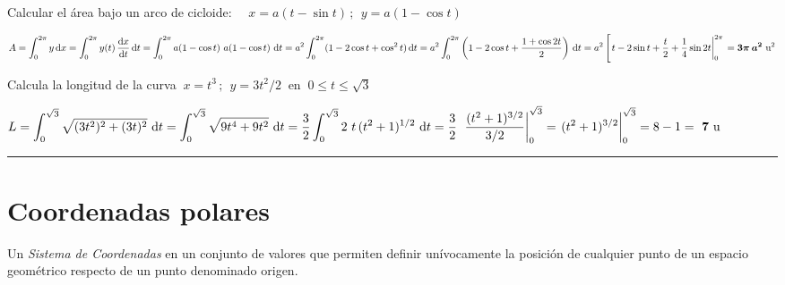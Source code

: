 \vspace{5mm}

\begin{mipropuesto}
	
 
Calcular el área bajo un arco de cicloide: $\quad x=a(t-\sin t)\, ;\ \ y=a(1-\cos t)$

\end{mipropuesto}

$A=\displaystyle \int_0^{2\pi} y\, \dd x=\int_0^{2\pi} y(t)\, \dv{x}{t}\, \dd t = \int_0^{2\pi} a(1-\cos t)\ a(1-\cos t) \ \dd t=a^2\int_0^{2\pi} (1-2\cos t+\cos^2 t)\, \dd t= a^2\int_0^{2\pi} \left(1-2\cos t+\dfrac{1+\cos 2t}{2} \right)\, \dd t= 	a^2\left[ \eval{t-2\sin t+\dfrac t 2 +\dfrac 1 4 \sin 2t }_0^{2\pi} \right.= \boldsymbol{ 3\pi \, a^2 }\ \mathrm{u}^2$
	
	\vspace{5mm}

\begin{mipropuesto}

Calcula la longitud de la curva $\ x=t^3\, ; \ \ y=3t^2/2\ $ en $\ 0\leqslant t\leqslant \sqrt 3$

\end{mipropuesto}

$L=\displaystyle \int_0^{\sqrt 3} \sqrt{(3t^2)^2+(3t)^2}\ \dd t = \int_0^{\sqrt 3} \sqrt{9t^4+9t^2}\ \dd t=\dfrac 3 2  \int_0^{\sqrt 3} 2\ t \, (t^2+1)^{1/2} \ \dd t = \dfrac 3 2 \ \eval{\dfrac{(t^2+1)^{3/2}}{3/2}}_0^{\sqrt{3}}=\eval{(t^2+1)^{3/2}}_0^{\sqrt{3}}=8-1=\ \boldsymbol 7\ \mathrm{u}$
	

\begin{flushright}\textcolor{teal}{\rule{250pt}{0.2pt}}	\end{flushright}

\section{Coordenadas polares}

\vspace{-5mm}
\vspace{0.5cm}

Un \emph{Sistema de Coordenadas} en un conjunto de valores que permiten definir unívocamente la posición de cualquier punto de un espacio geométrico respecto de un punto denominado origen. 

